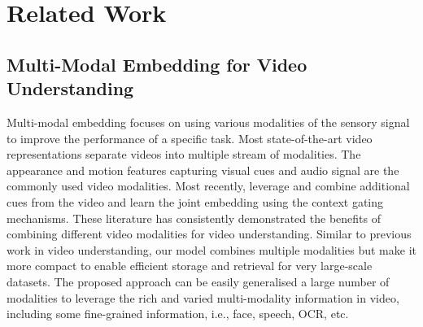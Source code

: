 \section{Related Work}

\subsection{Multi-Modal Embedding for Video Understanding}

Multi-modal embedding focuses on using various modalities of the sensory signal to improve the performance of a specific task. Most state-of-the-art video representations \cite{feichtenhofer2016convolutional,feichtenhofer2017spatiotemporal,simonyan2014two,miech2017learnable,wang2016temporal} separate videos into multiple stream of modalities. The appearance and motion features  \cite{feichtenhofer2016convolutional,simonyan2014two,carreira2017quo,girdhar2017actionvlad,varol2017long} capturing visual cues and audio signal \cite{miech2017learnable,monfortmoments} are the commonly used video modalities. Most recently, \cite{miech2018learning,liu2019use} leverage and combine additional cues from the video and learn the joint embedding using the context gating mechanisms. These literature has consistently demonstrated the benefits of combining different video modalities for video understanding. Similar to previous work in video understanding, our model combines multiple modalities but make it more compact to enable efficient storage and retrieval for very large-scale datasets. The proposed approach can be easily generalised a large number of modalities to leverage the rich and varied multi-modality information in video, including some fine-grained information, i.e., face, speech, OCR, etc. 




